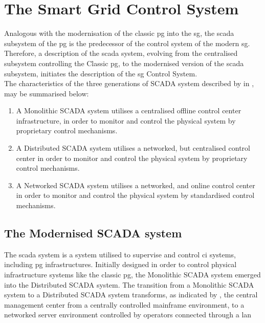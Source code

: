 
\section{The Smart Grid Control System}


Analogous with the modernisation of the classic \acrlong{pg} into the \acrlong{sg}, the \acrshort{scada} subsystem of the \acrshort{pg} is the predecessor of the control system of the modern \acrlong{sg}.
Therefore, a description of the \acrshort{scada} system, evolving from the centralised subsystem controlling the Classic \acrshort{pg}, to the modernised version of the \acrshort{scada} subsystem, initiates the description of the \acrlong{sg} Control System. \\ 




The characteristics of the three generations of SCADA system described by  in \cite{alcaraz2012security},
may be summarised below:
 

 \begin{enumerate}
     \item A Monolithic SCADA system utilises a centralised offline control center  infrastructure, in order to monitor and control the physical system by proprietary control mechanisms.
     \item A Distributed SCADA system utilises a networked, but centralised control  center in order to monitor and control the physical system by proprietary control mechanisms. 
     \item A Networked SCADA system utilises a networked, and online control  center in order to monitor and control the physical system by standardised control mechanisms.
 \end{enumerate}







\subsection{The Modernised SCADA system}
 
 The \acrshort{scada} system is%
 a system utilised to supervise and control \acrfull{ci} systems, including \acrshort{pg} infrastructures. Initially designed in order to control physical infrastructure systems like the classic \acrlong{pg}, the Monolithic SCADA system emerged into the Distributed SCADA system. The transition from a Monolithic SCADA system to a Distributed SCADA system transforms, as indicated by %
 , the central management center from a centrally controlled mainframe environment, to a networked server environment controlled by operators connected through a \acrfull{lan}
  
